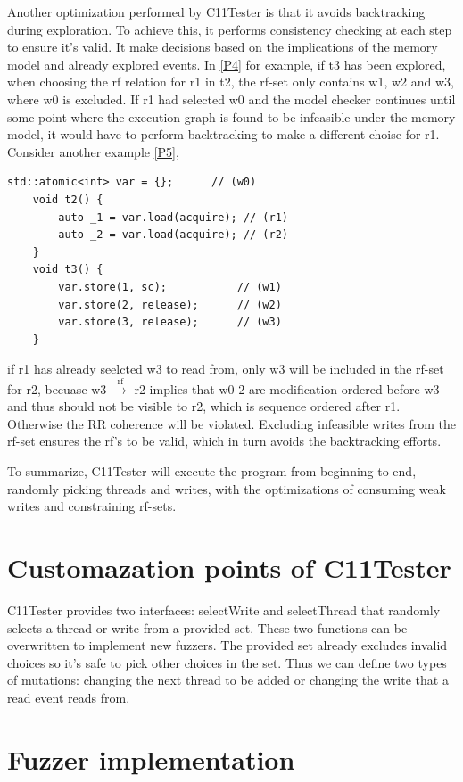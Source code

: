 Another optimization performed by C11Tester is that it avoids backtracking during exploration. To achieve this, it performs consistency checking at each step to ensure it's valid. It make decisions based on the implications of the memory model and already explored events. In \ref{P4} for example, if t3 has been explored, when choosing the rf relation for r1 in t2, the rf-set only contains w1, w2 and w3, where w0 is excluded. If r1 had selected w0 and the model checker continues until some point where the execution graph is found to be infeasible under the memory model, it would have to perform backtracking to make a different choise for r1. Consider another example \ref{P5}, 
\begin{lstlisting}[caption={P5}, label={P5}]
    std::atomic<int> var = {};      // (w0)
    void t2() {
        auto _1 = var.load(acquire); // (r1)
        auto _2 = var.load(acquire); // (r2)
    }
    void t3() {
        var.store(1, sc);           // (w1)
        var.store(2, release);      // (w2)
        var.store(3, release);      // (w3)
    }
\end{lstlisting}
if r1 has already seelcted w3 to read from, only w3 will be included in the rf-set for r2, becuase w3 $\xrightarrow{\text{rf}}$ r2 implies that w0-2 are modification-ordered before w3 and thus should not be visible to r2, which is sequence ordered after r1. Otherwise the RR coherence will be violated. Excluding infeasible writes from the rf-set ensures the rf's to be valid, which in turn avoids the backtracking efforts. 

To summarize, C11Tester will execute the program from beginning to end, randomly picking threads and writes, with the optimizations of consuming weak writes and constraining rf-sets. 


\section{Customazation points of C11Tester}

C11Tester provides two interfaces: selectWrite and selectThread that randomly selects a thread or write from a provided set. These two functions can be overwritten to implement new fuzzers. The provided set already excludes invalid choices so it's safe to pick other choices in the set. Thus we can define two types of mutations: changing the next thread to be added or changing the write that a read event reads from. 

\section{Fuzzer implementation}


